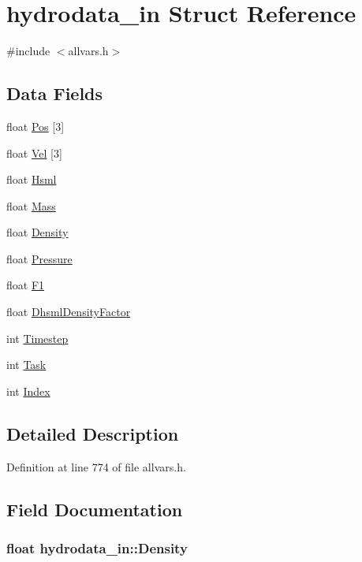 \hypertarget{structhydrodata__in}{
\section{hydrodata\_\-in Struct Reference}
\label{structhydrodata__in}
}


{\ttfamily \#include $<$allvars.h$>$}

\subsection*{Data Fields}
\begin{DoxyCompactItemize}
\item 
float \hyperlink{structhydrodata__in_af50edb8226de4bdcdbcc0f2679cc694d}{Pos} \mbox{[}3\mbox{]}
\item 
float \hyperlink{structhydrodata__in_aac935e4620b7700cae000a32a2922df4}{Vel} \mbox{[}3\mbox{]}
\item 
float \hyperlink{structhydrodata__in_ae24f9ceb40451913af1ab6e793772bdd}{Hsml}
\item 
float \hyperlink{structhydrodata__in_a5fb05f5111cc5541a5f2d9ad647b0665}{Mass}
\item 
float \hyperlink{structhydrodata__in_ac408286b56271e4e30f8c149a812948c}{Density}
\item 
float \hyperlink{structhydrodata__in_a95298759ae954d623a92d59f71d318ba}{Pressure}
\item 
float \hyperlink{structhydrodata__in_a2b0cc9653b307eac998cec7175036b20}{F1}
\item 
float \hyperlink{structhydrodata__in_ad2da50b0d4b51a53f9fb5cb4c41f20b8}{DhsmlDensityFactor}
\item 
int \hyperlink{structhydrodata__in_a6b2160624adc7ad0304597845531ffa7}{Timestep}
\item 
int \hyperlink{structhydrodata__in_a7d38ae5b3289a90c4d33add0572942cc}{Task}
\item 
int \hyperlink{structhydrodata__in_a630be87b2fd46a0e22f57bde1a48e015}{Index}
\end{DoxyCompactItemize}


\subsection{Detailed Description}


Definition at line 774 of file allvars.h.



\subsection{Field Documentation}
\hypertarget{structhydrodata__in_ac408286b56271e4e30f8c149a812948c}{
\subsubsection[{Density}]{\setlength{\rightskip}{0pt plus 5cm}float {\bf hydrodata\_\-in::Density}}}
\label{structhydrodata__in_ac408286b56271e4e30f8c149a812948c}


